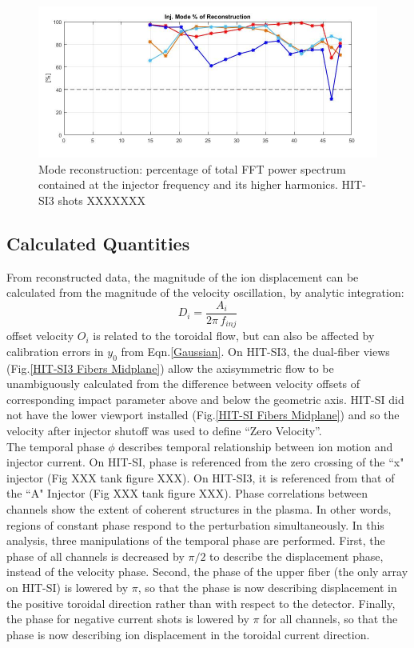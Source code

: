 \documentclass{AIAA}
\begin{document}
\begin{figure}
\includegraphics[width=6in]{160728011L2L1VelSpect}\caption{Mode reconstruction: percentage of total FFT power spectrum contained at the injector frequency and its higher harmonics. HIT-SI3 shots XXXXXXX}\label{Fig::FFT Spect}
\end{figure}
\subsection{Calculated Quantities}\label{sec::CalcQuant}
From reconstructed data, the magnitude of the ion displacement can be calculated from the magnitude of the velocity oscillation, by analytic integration:
\begin{equation}
D_i=\frac{A_i}{{2\pi}\,f_{inj}}
\end{equation}
\hspace{4ex} offset velocity $O_i$ is related to the toroidal flow, but can also be affected by calibration errors in $y_0$ from Eqn.\ref{Gaussian}. On HIT-SI3, the dual-fiber views (Fig.\ref{HIT-SI3 Fibers Midplane}) allow the axisymmetric flow to be unambiguously calculated from the difference between velocity offsets of corresponding impact parameter above and below the geometric axis. HIT-SI did not have the lower viewport installed (Fig.\ref{HIT-SI Fibers Midplane}) and so the velocity after injector shutoff was used to define ``Zero Velocity''.\\
\hspace*{4ex}The temporal phase $\phi$ describes temporal relationship between ion motion and injector current. On HIT-SI, phase is referenced from the zero crossing of the ``x" injector (Fig XXX tank figure XXX). On HIT-SI3, it is referenced from that of the ``A" Injector (Fig XXX tank figure XXX). Phase correlations between channels show the extent of coherent structures in the plasma. In other words, regions of constant phase respond to the perturbation simultaneously.  In this analysis, three manipulations of the temporal phase are performed. First, the phase of all channels is decreased by $\pi/2$ to describe the displacement phase, instead of the velocity phase. Second, the phase of the upper fiber (the only array on HIT-SI) is lowered by $\pi$, so that the phase is now describing displacement in the positive toroidal direction rather than with respect to the detector. Finally, the phase for negative current shots is lowered by $\pi$ for all channels, so that the phase is now describing ion displacement in the toroidal current direction.   \\
\end{document}
